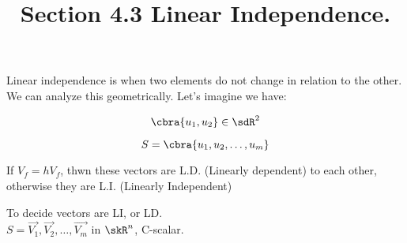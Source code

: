 \documentclass{article}
\title{Section 4.3 Linear Independence.}
\begin{document}
\maketitle
\pagebreak

Linear independence is when two elements do not change in relation to the other.
We can analyze this geometrically.
Let's imagine we have:

\[
    \cbra{u_{1}, u_{2}} \in \sdR^{2}
\]

\bdefn
\[
    S = \cbra{u_{1}, u_{2}, \dots, u_{m}}
\]

If $V_{f} = hV_{f}$, thwn these vectors are L.D. (Linearly dependent) to each other, otherwise they are L.I. (Linearly Independent)
\edefn
\hfill

\bthm
To decide vectors are LI, or LD. \\
\bcent
$S = {\vec{V_{1}}, \vec{V_{2}},\dots, \vec{V_{m}} }$ in $\skR^{n}$, C-scalar.\\
\ecent
\end{document}
